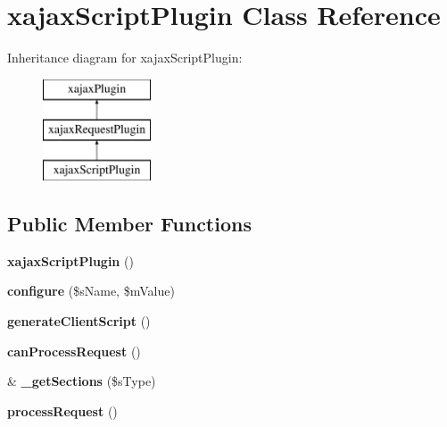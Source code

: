 \hypertarget{classxajaxScriptPlugin}{
\section{xajaxScriptPlugin Class Reference}
\label{classxajaxScriptPlugin}
}
Inheritance diagram for xajaxScriptPlugin:\begin{figure}[H]
\begin{center}
\leavevmode
\includegraphics[height=3.000000cm]{classxajaxScriptPlugin}
\end{center}
\end{figure}
\subsection*{Public Member Functions}
\begin{DoxyCompactItemize}
\item 
\hypertarget{classxajaxScriptPlugin_a8389a6bae9f4937faecd906442a9de4e}{
{\bfseries xajaxScriptPlugin} ()}
\label{classxajaxScriptPlugin_a8389a6bae9f4937faecd906442a9de4e}

\item 
\hypertarget{classxajaxScriptPlugin_a71bb6769b72a2e05c07c58d27bd3ed69}{
{\bfseries configure} (\$sName, \$mValue)}
\label{classxajaxScriptPlugin_a71bb6769b72a2e05c07c58d27bd3ed69}

\item 
\hypertarget{classxajaxScriptPlugin_a320eb355ddda85828ff0b457f513c188}{
{\bfseries generateClientScript} ()}
\label{classxajaxScriptPlugin_a320eb355ddda85828ff0b457f513c188}

\item 
\hypertarget{classxajaxScriptPlugin_a1b617f63084901c9a5e43fa092dd50df}{
{\bfseries canProcessRequest} ()}
\label{classxajaxScriptPlugin_a1b617f63084901c9a5e43fa092dd50df}

\item 
\hypertarget{classxajaxScriptPlugin_ab14231e11c64f49d2b33f84c472fede0}{
\& {\bfseries \_\-getSections} (\$sType)}
\label{classxajaxScriptPlugin_ab14231e11c64f49d2b33f84c472fede0}

\item 
\hypertarget{classxajaxScriptPlugin_af8e6ae94d1cac1833bb4b5ab7971baf8}{
{\bfseries processRequest} ()}
\label{classxajaxScriptPlugin_af8e6ae94d1cac1833bb4b5ab7971baf8}

\end{DoxyCompactItemize}
